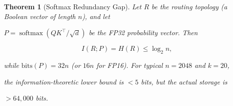 \documentclass[11pt]{article}
\newtheorem{theorem}{Theorem}[section]
\theoremstyle{definition}
\newcommand{\softmax}{\operatorname{softmax}}
\begin{document}
\begin{theorem}[Softmax Redundancy Gap]





Let $R$ be the routing topology (a Boolean vector of length $n$), and let





$P = \softmax(QK^\top / \sqrt{d})$ be the FP32 probability vector. Then





\[





I(R; P) = H(R) \leq \log_2 n,





\]





while $\mathrm{bits}(P) = 32n$ (or $16n$ for FP16). For typical $n = 2048$ and $k = 20$,





the information-theoretic lower bound is $<5$ bits, but the actual storage is





$>64{,}000$ bits.





\end{theorem}


























\end{document}
